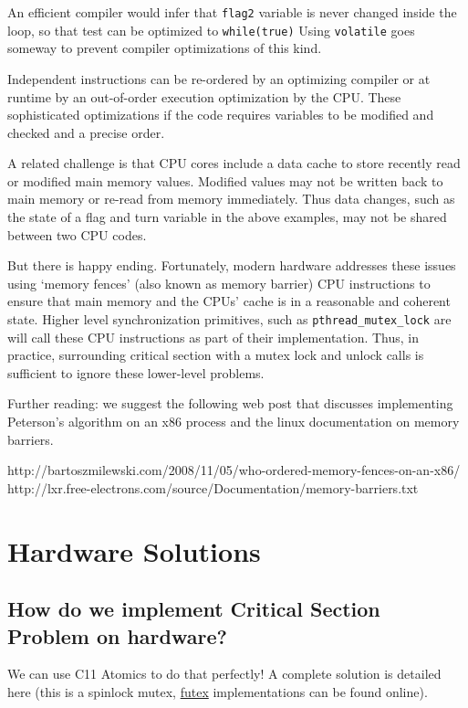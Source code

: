 An efficient compiler would infer that \texttt{flag2} variable is never
changed inside the loop, so that test can be optimized to
\texttt{while(true)} Using \texttt{volatile} goes someway to prevent
compiler optimizations of this kind.

Independent instructions can be re-ordered by an optimizing compiler or
at runtime by an out-of-order execution optimization by the CPU. These
sophisticated optimizations if the code requires variables to be
modified and checked and a precise order.

A related challenge is that CPU cores include a data cache to store
recently read or modified main memory values. Modified values may not be
written back to main memory or re-read from memory immediately. Thus
data changes, such as the state of a flag and turn variable in the above
examples, may not be shared between two CPU codes.

But there is happy ending. Fortunately, modern hardware addresses these
issues using `memory fences' (also known as memory barrier) CPU
instructions to ensure that main memory and the CPUs' cache is in a
reasonable and coherent state. Higher level synchronization primitives,
such as \texttt{pthread\_mutex\_lock} are will call these CPU
instructions as part of their implementation. Thus, in practice,
surrounding critical section with a mutex lock and unlock calls is
sufficient to ignore these lower-level problems.

Further reading: we suggest the following web post that discusses
implementing Peterson's algorithm on an x86 process and the linux
documentation on memory barriers.

http://bartoszmilewski.com/2008/11/05/who-ordered-memory-fences-on-an-x86/
http://lxr.free-electrons.com/source/Documentation/memory-barriers.txt

\section{Hardware Solutions}\label{hardware-solutions}

\subsection{How do we implement Critical Section Problem on
hardware?}\label{how-do-we-implement-critical-section-problem-on-hardware}

We can use C11 Atomics to do that perfectly! A complete solution is
detailed here (this is a spinlock mutex,
\href{https://locklessinc.com/articles/mutex_cv_futex/}{futex}
implementations can be found online).

